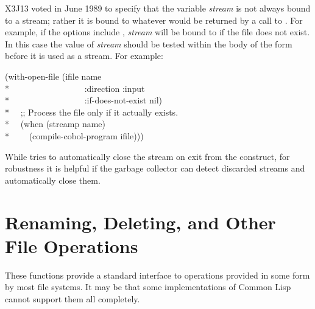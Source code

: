 \begin{defmac}
\begin{newer}
X3J13 voted in June 1989 
to specify that the variable {\it stream} is not always bound to
a stream; rather it is bound to whatever would be returned by
a call to .  For example, if the options include
, {\it stream} will be bound to 
if the file does not exist.  In this case the value of {\it stream}
should be tested within the body of the  form
before it is used as a stream.  For example:
\begin{lisp}
(with-open-file (ifile name \\*
~~~~~~~~~~~~~~~~~:direction :input \\*
~~~~~~~~~~~~~~~~~:if-does-not-exist nil) \\*
~~;; Process the file only if it actually exists. \\*
~~(when (streamp name)\\*
~~~~(compile-cobol-program ifile)))
\end{lisp}
\end{newer}
\end{defmac}

\beforenoterule
\begin{implementation}
While  tries to automatically close
the stream on exit from the construct, for robustness it is helpful
if the garbage collector can detect discarded streams and automatically
close them.
\end{implementation}
\afternoterule

\section{Renaming, Deleting, and Other File Operations}

These functions provide a standard interface to operations provided
in some form by most file systems.  It may be that some implementations
of Common Lisp cannot support them all completely.

